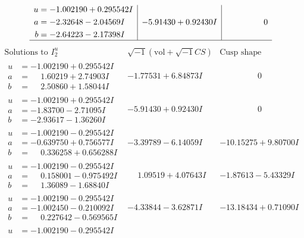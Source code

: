 \documentclass[1p]{elsarticle_modified}
\theoremstyle{definition}
\newcommand{\I}{\sqrt{-1}}
\begin{document}
$$\begin{array}{c|c|c}
\begin{aligned}
u &= -1.002190 + 0.295542 I \\
a &= -2.32648 - 2.04569 I \\
b &= -2.64223 - 2.17398 I\end{aligned}
 & -5.91430 + 0.92430 I & \phantom{-0.000000 } 0\\
 \hline 
 \end{array}$$\newpage$$\begin{array}{c|c|c}  
\text{Solutions to }I^u_{2}& \I (\text{vol} + \sqrt{-1}CS) & \text{Cusp shape}\\
 \hline 
\begin{aligned}
u &= -1.002190 + 0.295542 I \\
a &= \phantom{-}1.60219 + 2.74903 I \\
b &= \phantom{-}2.50860 + 1.58044 I\end{aligned}
 & -1.77531 + 6.84873 I & \phantom{-0.000000 } 0 \\ \hline\begin{aligned}
u &= -1.002190 + 0.295542 I \\
a &= -1.83700 - 2.71095 I \\
b &= -2.93617 - 1.36260 I\end{aligned}
 & -5.91430 + 0.92430 I & \phantom{-0.000000 } 0 \\ \hline\begin{aligned}
u &= -1.002190 - 0.295542 I \\
a &= -0.639750 + 0.756577 I \\
b &= \phantom{-}0.336258 + 0.656288 I\end{aligned}
 & -3.39789 - 6.14059 I & -10.15275 + 9.80700 I \\ \hline\begin{aligned}
u &= -1.002190 - 0.295542 I \\
a &= \phantom{-}0.158001 - 0.975492 I \\
b &= \phantom{-}1.36089 - 1.68840 I\end{aligned}
 & \phantom{-}1.09519 + 4.07643 I & -1.87613 - 5.43329 I \\ \hline\begin{aligned}
u &= -1.002190 - 0.295542 I \\
a &= -1.002450 - 0.210092 I \\
b &= \phantom{-}0.227642 - 0.569565 I\end{aligned}
 & -4.33844 - 3.62871 I & -13.18434 + 0.71090 I \\ \hline\begin{aligned}
u &= -1.002190 - 0.295542 I \\

\end{aligned}
\end{array}$$
\end{document}
